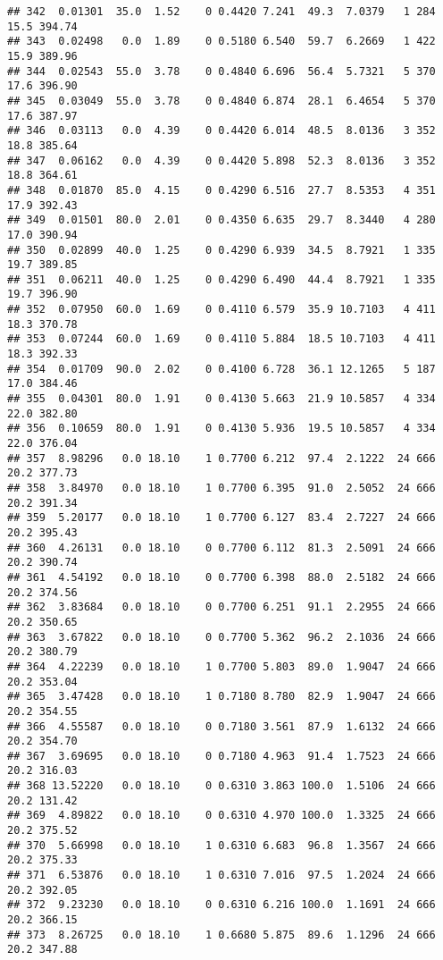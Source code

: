 \documentclass[
]{article}
\begin{document}
\begin{verbatim}
## 342  0.01301  35.0  1.52    0 0.4420 7.241  49.3  7.0379   1 284    15.5 394.74
## 343  0.02498   0.0  1.89    0 0.5180 6.540  59.7  6.2669   1 422    15.9 389.96
## 344  0.02543  55.0  3.78    0 0.4840 6.696  56.4  5.7321   5 370    17.6 396.90
## 345  0.03049  55.0  3.78    0 0.4840 6.874  28.1  6.4654   5 370    17.6 387.97
## 346  0.03113   0.0  4.39    0 0.4420 6.014  48.5  8.0136   3 352    18.8 385.64
## 347  0.06162   0.0  4.39    0 0.4420 5.898  52.3  8.0136   3 352    18.8 364.61
## 348  0.01870  85.0  4.15    0 0.4290 6.516  27.7  8.5353   4 351    17.9 392.43
## 349  0.01501  80.0  2.01    0 0.4350 6.635  29.7  8.3440   4 280    17.0 390.94
## 350  0.02899  40.0  1.25    0 0.4290 6.939  34.5  8.7921   1 335    19.7 389.85
## 351  0.06211  40.0  1.25    0 0.4290 6.490  44.4  8.7921   1 335    19.7 396.90
## 352  0.07950  60.0  1.69    0 0.4110 6.579  35.9 10.7103   4 411    18.3 370.78
## 353  0.07244  60.0  1.69    0 0.4110 5.884  18.5 10.7103   4 411    18.3 392.33
## 354  0.01709  90.0  2.02    0 0.4100 6.728  36.1 12.1265   5 187    17.0 384.46
## 355  0.04301  80.0  1.91    0 0.4130 5.663  21.9 10.5857   4 334    22.0 382.80
## 356  0.10659  80.0  1.91    0 0.4130 5.936  19.5 10.5857   4 334    22.0 376.04
## 357  8.98296   0.0 18.10    1 0.7700 6.212  97.4  2.1222  24 666    20.2 377.73
## 358  3.84970   0.0 18.10    1 0.7700 6.395  91.0  2.5052  24 666    20.2 391.34
## 359  5.20177   0.0 18.10    1 0.7700 6.127  83.4  2.7227  24 666    20.2 395.43
## 360  4.26131   0.0 18.10    0 0.7700 6.112  81.3  2.5091  24 666    20.2 390.74
## 361  4.54192   0.0 18.10    0 0.7700 6.398  88.0  2.5182  24 666    20.2 374.56
## 362  3.83684   0.0 18.10    0 0.7700 6.251  91.1  2.2955  24 666    20.2 350.65
## 363  3.67822   0.0 18.10    0 0.7700 5.362  96.2  2.1036  24 666    20.2 380.79
## 364  4.22239   0.0 18.10    1 0.7700 5.803  89.0  1.9047  24 666    20.2 353.04
## 365  3.47428   0.0 18.10    1 0.7180 8.780  82.9  1.9047  24 666    20.2 354.55
## 366  4.55587   0.0 18.10    0 0.7180 3.561  87.9  1.6132  24 666    20.2 354.70
## 367  3.69695   0.0 18.10    0 0.7180 4.963  91.4  1.7523  24 666    20.2 316.03
## 368 13.52220   0.0 18.10    0 0.6310 3.863 100.0  1.5106  24 666    20.2 131.42
## 369  4.89822   0.0 18.10    0 0.6310 4.970 100.0  1.3325  24 666    20.2 375.52
## 370  5.66998   0.0 18.10    1 0.6310 6.683  96.8  1.3567  24 666    20.2 375.33
## 371  6.53876   0.0 18.10    1 0.6310 7.016  97.5  1.2024  24 666    20.2 392.05
## 372  9.23230   0.0 18.10    0 0.6310 6.216 100.0  1.1691  24 666    20.2 366.15
## 373  8.26725   0.0 18.10    1 0.6680 5.875  89.6  1.1296  24 666    20.2 347.88

\end{verbatim}
\end{document}
